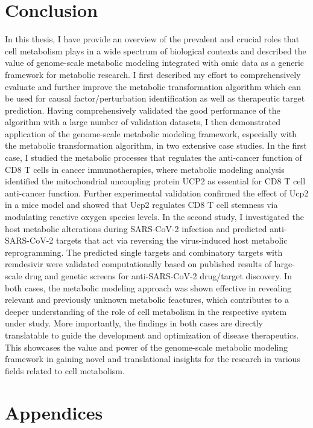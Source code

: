\documentclass[12pt,twoside,openany,\mydriver]{thesis}  %
\begin{document}
\hypertarget{conclusion}{%
\chapter*{Conclusion}\label{conclusion}}

In this thesis, I have provide an overview of the prevalent and crucial roles that cell metabolism plays in a wide spectrum of biological contexts and described the value of genome-scale metabolic modeling integrated with omic data as a generic framework for metabolic research. I first described my effort to comprehensively evaluate and further improve the metabolic transformation algorithm which can be used for causal factor/perturbation identification as well as therapeutic target prediction. Having comprehensively validated the good performance of the algorithm with a large number of validation datasets, I then demonstrated application of the genome-scale metabolic modeling framework, especially with the metabolic transformation algorithm, in two extensive case studies. In the first case, I studied the metabolic processes that regulates the anti-cancer function of CD8 T cells in cancer immunotherapies, where metabolic modeling analysis identified the mitochondrial uncoupling protein UCP2 as essential for CD8 T cell anti-cancer function. Further experimental validation confirmed the effect of Ucp2 in a mice model and showed that Ucp2 regulates CD8 T cell stemness via modulating reactive oxygen species levels. In the second study, I investigated the host metabolic alterations during SARS-CoV-2 infection and predicted anti-SARS-CoV-2 targets that act via reversing the virus-induced host metabolic reprogramming. The predicted single targets and combinatory targets with remdesivir were validated computationally based on published results of large-scale drug and genetic screens for anti-SARS-CoV-2 drug/target discovery. In both cases, the metabolic modeling approach was shown effective in revealing relevant and previously unknown metabolic feactures, which contributes to a deeper understanding of the role of cell metabolism in the respective system under study. More importantly, the findings in both cases are directly translatable to guide the development and optimization of disease therapeutics. This showcases the value and power of the genome-scale metabolic modeling framework in gaining novel and translational insights for the research in various fields related to cell metabolism.

\hypertarget{appendices}{%
\chapter*{Appendices}\label{appendices}}
\end{document}
